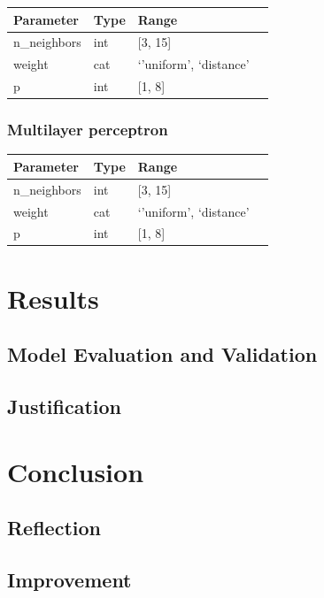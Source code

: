 \documentclass[a4paper,12pt,nottoc]{article}
\begin{document}
\begin{center}
\begin{tabular}{| l | l | l | l |}
\hline
Parameter & Type & Range \\
\hline
n\_neighbors & int & [3, 15] \\
weight & cat & `'uniform', `distance' \\
p & int & [1, 8] \\
\hline 
\end{tabular}
\end{center}

\subsubsection*{Multilayer perceptron \cite{bib:knn}}

\begin{center}
\begin{tabular}{| l | l | l | l |}
\hline
Parameter & Type & Range \\
\hline
n\_neighbors & int & [3, 15] \\
weight & cat & `'uniform', `distance' \\
p & int & [1, 8] \\
\hline 
\end{tabular}
\end{center}


\section{Results}

\subsection{Model Evaluation and Validation}

\subsection{Justification}

\section{Conclusion}

\subsection{Reflection}

\subsection{Improvement}
\end{document}

